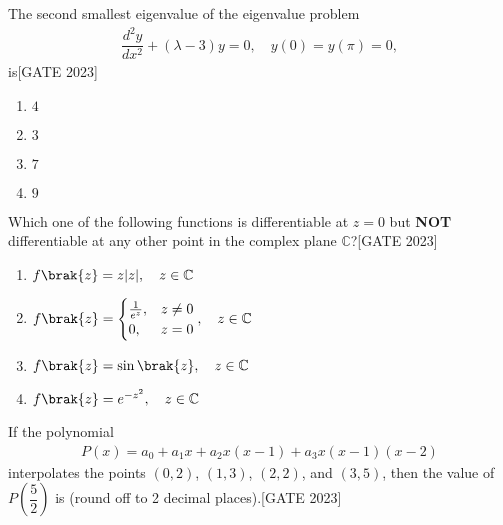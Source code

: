 \iffalse
\title{2023-XE}
\author{EE24BTECH11020 -  Ellanti Rohith}
\section{xe}
\chapter{2023}
\fi



    \item The second smallest eigenvalue of the eigenvalue problem
    \begin{align*}
    \dfrac{d^2 y}{dx^2} + (\lambda - 3)y = 0, \quad y(0) = y(\pi) = 0,
    \end{align*}
    is\hfill{[GATE 2023]}
    \begin{multicols}{4}
    \begin{enumerate}
        \item $4$
        \item $3$
        \item $7$
        \item $9$
    \end{enumerate}
    \end{multicols}

    \item Which one of the following functions is differentiable at $z = 0$ but \textbf{NOT} differentiable at any other point in the complex plane $\mathbb{C}$?\hfill{[GATE 2023]}
    \begin{multicols}{2}
    \begin{enumerate}
        \item $f\brak{z} = z |z|, \quad z \in \mathbb{C}$
        
        \item $f\brak{z} = \begin{cases} \frac{1}{e^z}, & z \neq 0 \\ 0, & z = 0 \end{cases}, \quad z \in \mathbb{C}$\item $f\brak{z} = \sin\brak{z}, \quad z \in \mathbb{C}$
        \item $f\brak{z} = e^{-z^2}, \quad z \in \mathbb{C}$
    \end{enumerate}
    \end{multicols}

    \item If the polynomial
    \begin{align*}
    P(x) = a_0 + a_1 x + a_2 x (x - 1) + a_3 x (x - 1)(x - 2)
    \end{align*}
    interpolates the points $(0,2)$, $(1,3)$, $(2,2)$, and $(3,5)$, then the value of $P\left(\dfrac{5}{2}\right)$ is \underline{\hspace{1cm}} (round off to 2 decimal places).\hfill{[GATE 2023]}

